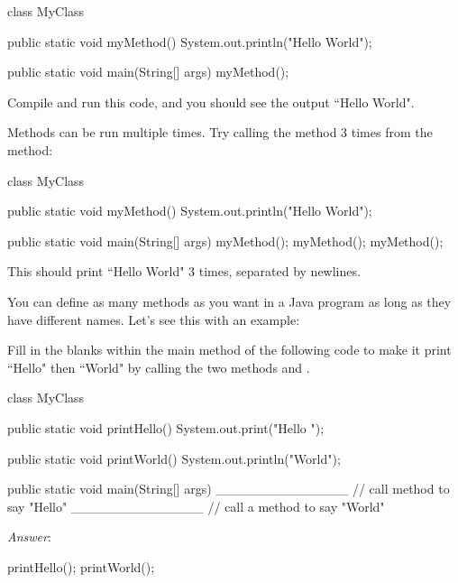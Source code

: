 \begin{code}
class MyClass {
  public static void myMethod() {
    System.out.println("Hello World");
  }

  public static void main(String[] args) {
    myMethod();
  }
}
\end{code}

Compile and run this code, and you should see the output ``Hello World". 

Methods can be run multiple times. Try calling the  method 3 times from the  method:

\begin{code}
class MyClass {
  public static void myMethod() {
    System.out.println("Hello World");
  }

  public static void main(String[] args) {
    myMethod();
    myMethod();
    myMethod();
  }
}
\end{code}

This should print ``Hello World" 3 times, separated by newlines. 

You can define as many methods as you want in a Java program as long as they have different names. Let's see this with an example: 

\begin{example}
Fill in the blanks within the main method of the following code to make it print ``Hello" then ``World" by calling the two methods  and . 
\begin{code}
class MyClass {

    public static void printHello() {
        System.out.print("Hello ");
    }
    
    public static void printWorld() {
        System.out.println("World");
    }

    public static void main(String[] args) {
        ______________ // call method to say "Hello"
        ______________ // call a method to say "World"
    }
}
\end{code}
\noindent \emph{Answer}:
\begin{code}
    printHello();
    printWorld();
\end{code}
\end{example}

